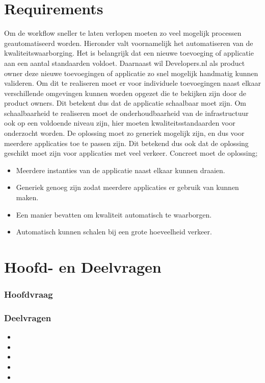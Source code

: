\section{Requirements}
Om de workflow sneller te laten verlopen moeten zo veel mogelijk processen geautomatiseerd worden. Hieronder valt voornamelijk het automatiseren van de kwaliteitswaarborging. Het is belangrijk dat een nieuwe toevoeging of applicatie aan een aantal standaarden voldoet. Daarnaast wil Developers.nl als product owner deze nieuwe toevoegingen of applicatie zo snel mogelijk handmatig kunnen valideren. Om dit te realiseren moet er voor individuele toevoegingen naast elkaar verschillende omgevingen kunnen worden opgezet die te bekijken zijn door de product owners. Dit betekent dus dat de applicatie schaalbaar moet zijn. Om schaalbaarheid te realiseren moet de onderhoudbaarheid van de infrastructuur ook op een voldoende niveau zijn, hier moeten kwaliteitsstandaarden voor onderzocht worden. De oplossing moet zo generiek mogelijk zijn, en dus voor meerdere applicaties toe te passen zijn. Dit betekend dus ook dat de oplossing geschikt moet zijn voor applicaties met veel verkeer. Concreet moet de oplossing;
\begin{itemize}
	\item Meerdere instanties van de applicatie naast elkaar kunnen draaien.
	\item Generiek genoeg zijn zodat meerdere applicaties er gebruik van kunnen maken.
	\item Een manier bevatten om kwaliteit automatisch te waarborgen.
	\item Automatisch kunnen schalen bij een grote hoeveelheid verkeer.
\end{itemize}

\section{Hoofd- en Deelvragen}
\subsubsection{Hoofdvraag}
\hoofdvraagname

\subsubsection{Deelvragen}
\begin{itemize}
	\item \deeltechnieken
	\item \deelhuidig
	\item \deelverbetering
	\item \deelimplementatie
	\item \deelrequirements
\end{itemize}

